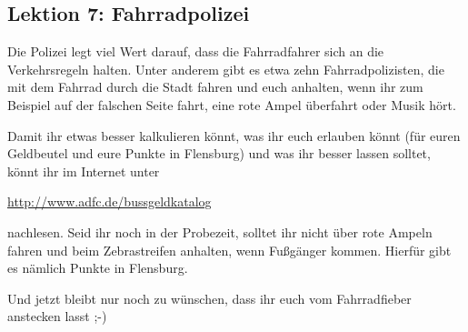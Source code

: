 \begin{multicols}{2}
\subsection{Lektion 7: Fahrradpolizei}
Die Polizei legt viel Wert darauf, dass die Fahrradfahrer sich an die Verkehrsregeln halten.
Unter anderem gibt es etwa zehn Fahrradpolizisten, die mit dem Fahrrad durch die Stadt fahren und euch anhalten, wenn ihr zum Beispiel auf der falschen Seite fahrt, eine rote Ampel überfahrt oder Musik hört.

Damit ihr etwas besser kalkulieren könnt, was ihr euch erlauben könnt (für euren Geldbeutel und eure Punkte in Flensburg) und was ihr besser lassen solltet, könnt ihr im Internet unter
\begin{center}
	\url{http://www.adfc.de/bussgeldkatalog}
\end{center}
nachlesen.
Seid ihr noch in der Probezeit, solltet ihr nicht über rote Ampeln fahren und beim Zebrastreifen anhalten, wenn Fußgänger kommen.
Hierfür gibt es nämlich Punkte in Flensburg.

Und jetzt bleibt nur noch zu wünschen, dass ihr euch vom Fahrradfieber anstecken lasst ;-)

\end{multicols}
